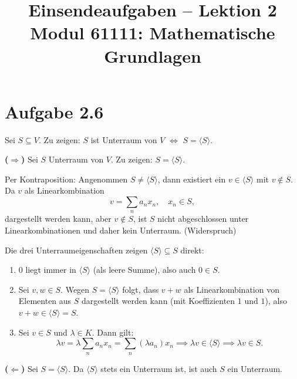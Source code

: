 \documentclass[a4paper,12pt]{article}
\title{Einsendeaufgaben -- Lektion 2\\[0.5em]
\large Modul 61111: Mathematische Grundlagen}
\author{}
\date{}
\begin{document}
\maketitle

\section*{Aufgabe 2.6}

Sei $S \subseteq V$. Zu zeigen: $S$ ist Unterraum von $V$ $\iff$ $S = \langle S \rangle$.

\bigskip
\noindent\textbf{($\Rightarrow$)} Sei $S$ Unterraum von $V$. Zu zeigen: $S = \langle S \rangle$.

Per Kontraposition: Angenommen $S \neq \langle S \rangle$, dann existiert ein
$v \in \langle S \rangle$ mit $v \notin S$. Da $v$ als Linearkombination
\[
  v = \sum_{n} a_n x_n, \quad x_n \in S,
\]
dargestellt werden kann, aber $v \notin S$, ist $S$ nicht abgeschlossen unter
Linearkombinationen und daher kein Unterraum. (Widerspruch)

Die drei Unterraumeigenschaften zeigen $\langle S \rangle \subseteq S$ direkt:
\begin{enumerate}[label=\arabic*.]
  \item $0$ liegt immer in $\langle S \rangle$ (als leere Summe), also auch $0 \in S$.

  \item Sei $v, w \in S$. Wegen $S = \langle S \rangle$ folgt, dass $v + w$ als
  Linearkombination von Elementen aus $S$ dargestellt werden kann
  (mit Koeffizienten $1$ und $1$), also $v + w \in \langle S \rangle = S$.

  \item Sei $v \in S$ und $\lambda \in K$. Dann gilt:
  \[
    \lambda v = \lambda \sum_{n} a_n x_n = \sum_{n} (\lambda a_n) x_n
    \implies \lambda v \in \langle S \rangle \implies \lambda v \in S.
  \]
\end{enumerate}

\bigskip
\noindent\textbf{($\Leftarrow$)} Sei $S = \langle S \rangle$. Da $\langle S \rangle$
stets ein Unterraum ist, ist auch $S$ ein Unterraum.
\end{document}
